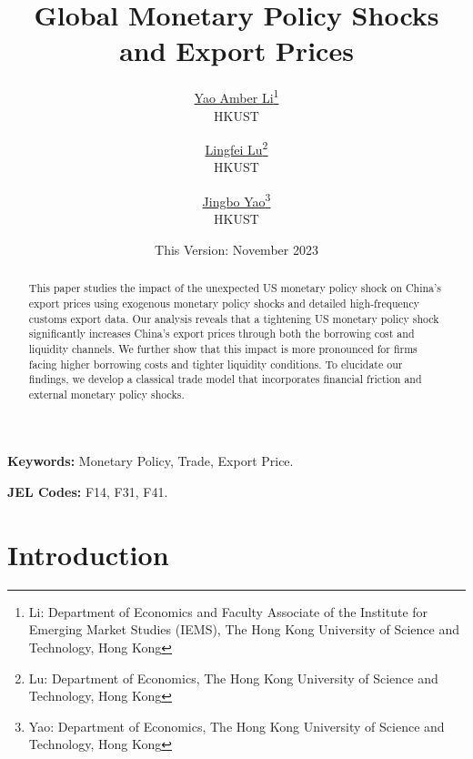 

\linespread{1.2}
\geometry{a4paper,scale=0.75}
\setlength{\parskip}{0.5em}




\title{\Large \textbf{Global Monetary Policy Shocks and Export Prices}}

\author{\large \href{http://yaoli.people.ust.hk/}{Yao Amber Li}\thanks{Li: Department of Economics and Faculty Associate of the Institute for Emerging Market Studies (IEMS), The Hong Kong University of Science and Technology, Hong Kong}\\ \large{HKUST}
\medskip
\and \href{}{Lingfei Lu}\thanks{Lu: Department of Economics, The Hong Kong University of Science and Technology, Hong Kong } \\ \large{HKUST}
\medskip
\and \href{}{Jingbo Yao}\thanks{Yao: Department of Economics, The Hong Kong University of Science and Technology, Hong Kong} \\ \large{HKUST}
}
\date{This Version: November 2023}

\maketitle

\begin{abstract}
This paper studies the impact of the unexpected US monetary policy shock on China's export prices using exogenous monetary policy shocks and detailed high-frequency customs export data. Our analysis reveals that a tightening US monetary policy shock significantly increases China's export prices through both the borrowing cost and liquidity channels. We further show that this impact is more pronounced for firms facing higher borrowing costs and tighter liquidity conditions. To elucidate our findings, we develop a classical trade model that incorporates financial friction and external monetary policy shocks.

\end{abstract}

\textbf{Keywords:} Monetary Policy, Trade, Export Price.

\textbf{JEL Codes:} F14, F31, F41.
\newpage

\tableofcontents


\section{Introduction}

